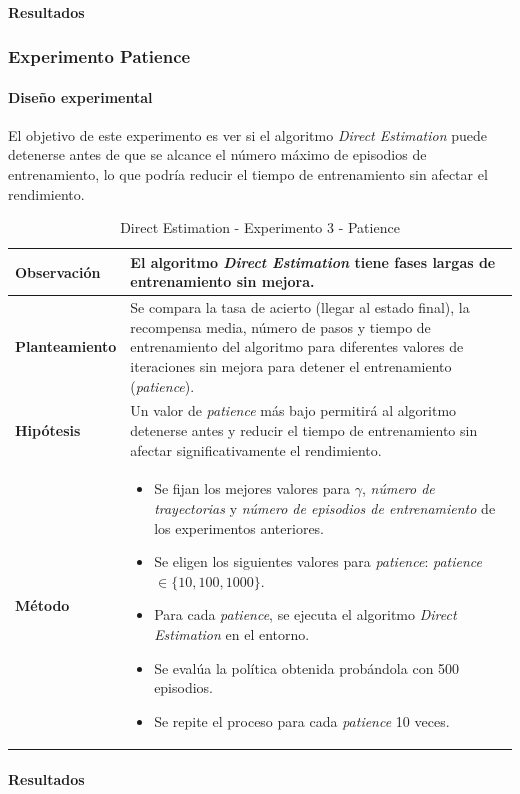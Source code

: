 \paragraph{Resultados}

\subsubsection{Experimento Patience}

\paragraph{Diseño experimental}

El objetivo de este experimento es ver si el algoritmo \textit{Direct Estimation} puede detenerse antes de que se alcance el número máximo de episodios de entrenamiento, lo que podría reducir el tiempo de entrenamiento sin afectar el rendimiento.

\begin{table}[H]
    \centering
    \begin{tabularx}{\textwidth}{|p{4cm}|X|} %
        \hline %
        \textbf{Observación} & El algoritmo \textit{Direct Estimation} tiene fases largas de entrenamiento sin mejora.
        \\ \hline
        \textbf{Planteamiento} & Se compara la tasa de acierto (llegar al estado final), la recompensa media, número de pasos y tiempo de entrenamiento del algoritmo para diferentes valores de iteraciones sin mejora para detener el entrenamiento (\textit{patience}).
        \\ \hline
        \textbf{Hipótesis} & Un valor de \textit{patience} más bajo permitirá al algoritmo detenerse antes y reducir el tiempo de entrenamiento sin afectar significativamente el rendimiento.
        \\ \hline
        \textbf{Método} & 
        \begin{itemize}
            \item Se fijan los mejores valores para \(\gamma\), \textit{número de trayectorias} y \textit{número de episodios de entrenamiento} de los experimentos anteriores.
            \item Se eligen los siguientes valores para \textit{patience}: \textit{patience} \(\in \{10, 100, 1000\}\).
            \item Para cada \textit{patience}, se ejecuta el algoritmo \textit{Direct Estimation} en el entorno.
            \item Se evalúa la política obtenida probándola con 500 episodios.
            \item Se repite el proceso para cada \textit{patience} 10 veces.
        \end{itemize}
        \\ \hline
    \end{tabularx}
    \caption{Direct Estimation - Experimento 3 - Patience}
    \label{tab:diseñoDirectEstimationExp3}
\end{table}

\paragraph{Resultados}